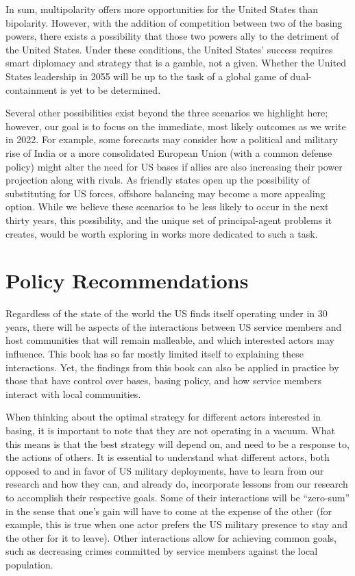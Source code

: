 In sum, multipolarity offers more opportunities for the United States than bipolarity. However, with the addition of competition between two of the basing powers, there exists a possibility that those two powers ally to the detriment of the United States. Under these conditions, the United States' success requires smart diplomacy and strategy that is a gamble, not a given. Whether the United States leadership in 2055 will be up to the task of a global game of dual-containment is yet to be determined. 

Several other possibilities exist beyond the three scenarios we highlight here; however, our goal is to focus on the immediate, most likely outcomes as we write in 2022. For example, some forecasts may consider how a political and military rise of India or a more consolidated European Union (with a common defense policy) might alter the need for US bases if allies are also increasing their power projection along with rivals. As friendly states open up the possibility of substituting for US forces, offshore balancing may become a more appealing option.\cite{Nieman2020} While we believe these scenarios to be less likely to occur in the next thirty years, this possibility, and the unique set of principal-agent problems it creates, would be worth exploring in works more dedicated to such a task.



\section*{Policy Recommendations}

Regardless of the state of the world the US finds itself operating under in 30 years, there will be aspects of the interactions between US service members and host communities that will remain malleable, and which interested actors may influence. This book has so far mostly limited itself to explaining these interactions. Yet, the findings from this book can also be applied in practice by those that have control over bases, basing policy, and how service members interact with local communities. 

When thinking about the optimal strategy for different actors interested in basing, it is important to note that they are not operating in a vacuum. What this means is that the best strategy will depend on, and need to be a response to, the actions of others. It is essential to understand what different actors, both opposed to and in favor of US military deployments, have to learn from our research and how they can, and already do, incorporate lessons from our research to accomplish their respective goals. Some of their interactions will be ``zero-sum'' in the sense that one's gain will have to come at the expense of the other (for example, this is true when one actor prefers the US military presence to stay and the other for it to leave). Other interactions allow for achieving common goals, such as decreasing crimes committed by service members against the local population.

